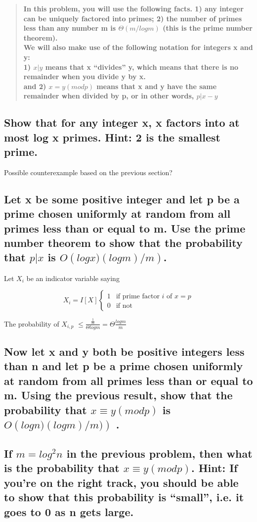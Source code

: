\documentclass[titlepage]{article}\usepackage[]{graphicx}\usepackage[]{color}
\begin{document}
\begin{quote}
	\textbf{
In this problem, you will use the following facts. 1) any integer can be
uniquely factored into primes; 2) the number of primes less than any number m
is $\Theta(m/ log m)$ (this is the prime number theorem). \\
We will also make use of the following notation for integers x and y: \\
1) $x|y$ means that x ``divides'' y, which means that there is no remainder
when you divide y by x. \\ 
and 2) $ x = y(modp)$ means that x and y have the same remainder when
divided by p, or in other words, $p|x−y$} 
\end{quote}

\subsection{Show that for any integer x, x factors into at most log x primes. Hint: 2 is
the smallest prime.}
Possible counterexample based on the previous section?

\subsection{ Let x be some positive integer and let p be a prime chosen uniformly at
random from all primes less than or equal to m. Use the prime number theorem to
show that the probability that $p|x$ is $O\left( log x)(log m)/m\right)$. }

Let $X_i$ be an indicator variable saying 

\[
	X_i = I[X]
  \begin{cases}
	1 & \text{if prime factor } i \text{ of } x = p \\
	0 & \text{if not } 
  \end{cases}
\]

The probability of $X_{i,p}$ $\leq \frac{\frac{1}{m}}{\Theta log m} = \Theta
\frac{log m}{m} $


\subsection{ Now let x and y both be positive integers less than n and let p be a prime
chosen uniformly at random from all primes less than or equal to m. Using the
previous result, show that the probability that $ x ≡ y (mod p)$  is $ O\left( log
n)(log m)/m)\right)$ . }

\subsection{ If $ m = log^2 n$  in the previous problem, then what is the probability that
$x ≡ y (mod p)$. Hint: If you're on the right track, you should be able to show
that this probability is ``small'', i.e. it goes to 0 as n gets large. }
\end{document}
